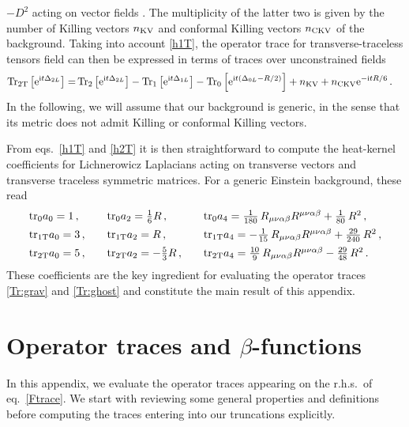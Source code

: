 \documentclass[preprint,preprintnumbers,amsmath,amssymb,nofootinbib,APS]{revtex4}
\newcommand{\be}{\begin{equation}}
\newcommand{\ee}{\end{equation}}
\let\m=\mu    \let\n=\nu    \let\x=\xi      \let\r=\rho \let\om=\omega
\newcommand{\tr}{{\rm tr}}
\newcommand{\Tr}{{\rm Tr}}
\newcommand{\2}{\sqrt{2\,}}
\newcommand{\I}{\mathrm{i}}
\newcommand{\e}{\mathrm{e}}
\begin{document}
\begin{appendix}
{$-D^2$ acting on vector fields \cite{Lauscher:2002mb,Codello:2008vh}.}
The multiplicity of the latter two is given by
the number of  Killing vectors $n_{\rm KV}$ and conformal Killing vectors $n_{\rm CKV}$
of the background. Taking into account \eqref{h1T}, the operator trace
for transverse-traceless tensors field can then be expressed in terms of traces over unconstrained fields
%
\be\label{h2T}
\begin{split}
\Tr_{\rm 2T}\left[ \e^{\I t \D_{2L}} \right] = & \, 
\Tr_{2}\left[ \e^{\I t \D_{2L}} \right] 
- \Tr_{1}\left[ \e^{\I t \D_{1L}} \right]
- \Tr_{0}\left[ \e^{\I t (\D_{0L} -R/2)} \right] 
 +  n_{\rm KV}+ n_{\rm CKV} \e^{-\I t R/6 }  \, .
\end{split}
\ee
%
In the following, we will assume that our background is generic, in the sense that its metric does not admit
Killing or conformal Killing vectors. 

From eqs.\ \eqref{h1T} and \eqref{h2T} it is then straightforward to compute the heat-kernel coefficients for Lichnerowicz
Laplacians acting on transverse vectors and transverse traceless symmetric matrices.  
For a generic Einstein background, these read
%
\be\label{d4heat}
\begin{array}{lll}
\tr_0 a_0 = 1 \, , \quad & 
\tr_0 a_2 = \frac{1}{6} R \, , \quad &
\tr_0 a_4 = \frac{1}{180} \, R_{\m\n\alpha\beta} R^{\m\n\alpha\beta} + \frac{1}{80} \, R^2 \, , \\[1.1ex]
%
\tr_{\rm 1T} a_0 = 3 \, , \quad & 
\tr_{\rm 1T} a_2 = R \, , \quad &
\tr_{\rm 1T} a_4 = - \frac{1}{15} \, R_{\m\n\alpha\beta} R^{\m\n\alpha\beta} + \frac{29}{240} \, R^2 \, , \\[1.1ex]
%
\tr_{\rm 2T} a_0 = 5 \, , \quad & 
\tr_{\rm 2T} a_2 = - \frac{5}{3} R \, , \quad &
\tr_{\rm 2T} a_4 = \frac{10}{9} \, R_{\m\n\alpha\beta} R^{\m\n\alpha\beta} - \frac{29}{48} \, R^2 \, .\\
\end{array}
\ee
%
These coefficients are the key ingredient for evaluating the operator traces 
 \eqref{Tr:grav} and \eqref{Tr:ghost}
and constitute the main result of this appendix.


\section{Operator traces and $\beta$-functions} 
\label{App:C}
In this appendix, we evaluate the operator traces appearing
on the r.h.s.\ of eq.\ \eqref{Ftrace}. We start with reviewing
some general properties and definitions before computing 
the traces entering into our truncations explicitly.

\end{appendix}
\end{document}
